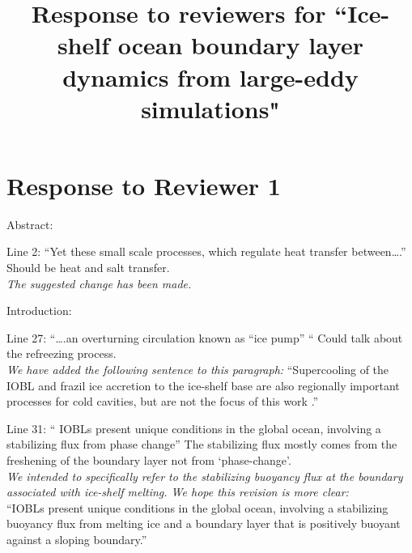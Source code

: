 \documentclass[tc, manuscript]{copernicus}
\begin{document}
\title{Response to reviewers for ``Ice-shelf ocean boundary layer dynamics from large-eddy simulations"}







\maketitle

\section{Response to Reviewer 1}

Abstract:

Line 2: “Yet these small scale processes, which regulate heat transfer between….”\\
Should be heat and salt transfer.\\
\textit{The suggested change has been made.}

Introduction:

Line 27: “….an overturning circulation known as “ice pump” “
Could talk about the refreezing process.\\
\textit{We have added the following sentence to this paragraph:}
``Supercooling of the IOBL and frazil ice accretion to the ice-shelf base are also regionally important processes for cold cavities, but are not the focus of this work \citep{galton-fenzi_modeling_2012, jordan_conditional_2015}.''

Line 31: “ IOBLs present unique conditions in the global ocean, involving a stabilizing flux from phase change” The stabilizing flux mostly comes from the freshening of the boundary layer not from ‘phase-change’.\\
\textit{We intended to specifically refer to the stabilizing buoyancy flux at the boundary associated with ice-shelf melting. We hope this revision is more clear:}\\
``IOBLs present unique conditions in the global ocean, involving a stabilizing buoyancy flux from melting ice and a boundary layer that is positively buoyant against a sloping boundary.''
\end{document}
